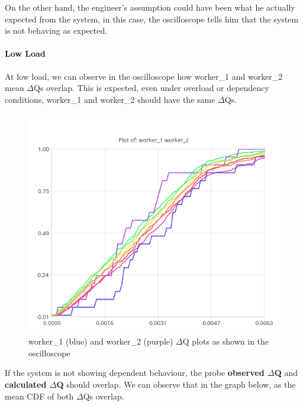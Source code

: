     On the other hand, the engineer's assumption could have been what he actually expected from the system, in this case, the oscilloscope tells him that the system is not behaving as expected.

    \paragraph{Low Load}

    At low load, we can observe in the oscilloscope how worker\_1 and worker\_2 mean $\Delta$Qs overlap. This is expected, even under overload or dependency conditions, worker\_1 and worker\_2 should have the same $\Delta$Qs.
    \begin{figure}[H]
        \begin{center}
            \includegraphics[scale=0.6]{img/superp21.png}
        \end{center}
        \caption{worker\_1 (blue) and worker\_2 (purple) $\Delta$Q plots as shown in the oscilloscope}
    \end{figure}

If the system is not showing dependent behaviour, the probe \textbf{observed $\Delta$Q} and \textbf{calculated $\Delta$Q} should overlap. We can observe that in the graph below, as the mean CDF of both $\Delta$Qs overlap.


